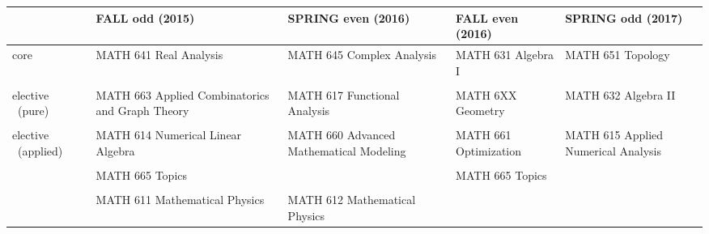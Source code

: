 \documentclass[12pt]{report}
\begin{document}
\pagestyle{empty}

\small
\begin{center}
\begin{tabular}{| p{1.6cm} || p{4.0cm} | p{4.0cm} | p{4.0cm} | p{4.0cm} |}

\hline
& \textbf{FALL odd (2015)} & \textbf{SPRING even (2016)} & \textbf{FALL even (2016)} & \textbf{SPRING odd (2017)} \\
\hline\hline
core & MATH 641 Real Analysis & MATH 645 Complex Analysis & MATH 631 Algebra I & MATH 651 Topology \\
&  &&&\\
\hline
elective 
~(pure) & MATH 663 Applied Combinatorics and Graph Theory & MATH 617 Functional Analysis & MATH 6XX Geometry & MATH 632 Algebra II \\
&  &&  & \\
\hline
elective 
~(applied) & MATH 614 Numerical Linear Algebra & MATH 660 Advanced Mathematical Modeling & MATH 661 Optimization & MATH 615 Applied Numerical Analysis \\
&  &&  & \\
\hline
& MATH 665 Topics && MATH 665 Topics&\\
&  &&  &\\
\hline
& MATH 611 Mathematical Physics & MATH 612 Mathematical Physics&& \\
\hline
\end{tabular}
\end{center}
\end{document}
